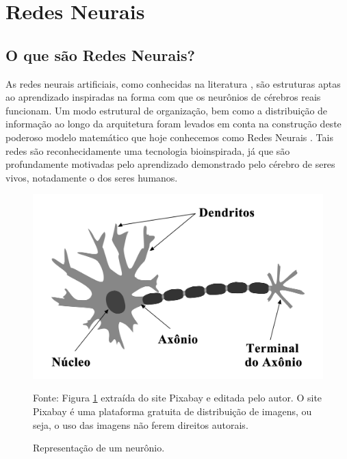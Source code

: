 \section{Redes Neurais}
\subsection{O que são Redes Neurais?}
\label{subsec:oquesaoredesneurais}

As redes neurais artificiais, como conhecidas na literatura \cite{haykin2004comprehensive, haykin2009neural, lecun2015deep}, são estruturas aptas ao aprendizado inspiradas na forma com que os neurônios de cérebros reais funcionam. Um modo estrutural de organização, bem como a distribuição de informação ao longo da arquitetura foram levados em conta na construção deste poderoso modelo matemático que hoje conhecemos como Redes Neurais \cite{haykin2004comprehensive, haykin2009neural, lecun2015deep}. Tais redes são reconhecidamente uma tecnologia bioinspirada, já que são profundamente motivadas pelo aprendizado demonstrado pelo cérebro de seres vivos, notadamente o dos seres humanos. 

\begin{figure}[h!]
    \centering
    \caption{Representação de um neurônio.}
    \includegraphics[scale=0.17]{Figuras/Cap2/neuronio.png}
    \begin{center}
    Fonte:
        Figura \ref{fig:neuronio} extraída do site Pixabay \cite{Pixabay} e editada pelo autor. O site Pixabay \cite{Pixabay} é uma plataforma gratuita de distribuição de imagens, ou seja, o uso das imagens não ferem direitos autorais.
    \end{center}
         
        \label{fig:neuronio}
\end{figure}


